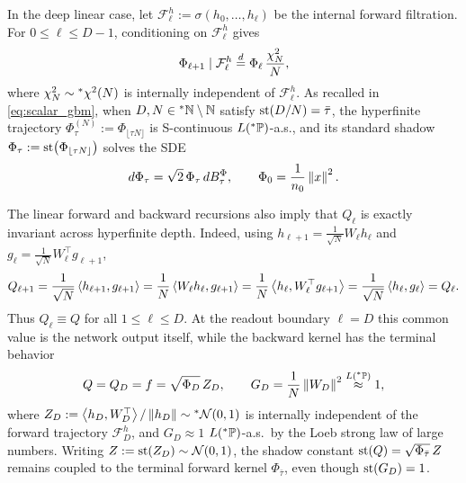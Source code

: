 \begin{remark}
\label{rem:forward-gbm-recall}
In the deep linear case, let $\mathcal{F}_\ell^h := \sigma(h_0, \dots, h_\ell)$ be the internal forward filtration. For $0 \le \ell \le D - 1$, conditioning on $\mathcal{F}_\ell^h$ gives
\begin{equation}
\label{eq:ch6-forward-chisq}
\Phi_{\ell+1} \mid \mathcal{F}_\ell^h \stackrel{d}{=} \Phi_\ell\,\frac{\chi_N^2}{N},
\end{equation}
where $\chi_N^2 \sim {}^*\chi^2(N)$ is internally independent of $\mathcal{F}_\ell^h$. As recalled in \eqref{eq:scalar_gbm},
when $D, N \in {}^*\mathbb{N} \setminus \mathbb{N}$ satisfy $\operatorname{st}(D/N) = \bar{\tau}$, the hyperfinite trajectory $\Phi_\tau^{(N)} := \Phi_{\lfloor \tau N \rfloor}$ is S-continuous $L({}^*\mathbb{P})$-a.s., and its standard shadow $\Phi_\tau := \operatorname{st}\bigl(\Phi_{\lfloor \tau N \rfloor}\bigr)$ solves the SDE
\begin{equation}
\label{eq:ch6-forward-gbm}
d\Phi_\tau = \sqrt{2}\,\Phi_\tau\,dB_\tau^\Phi, \qquad
\Phi_0 = \frac{1}{n_0}\left\lVert x \right\rVert^2.
\end{equation}
\end{remark}

The linear forward and backward recursions also imply that $Q_\ell$ is exactly invariant across hyperfinite depth. Indeed, using $h_{\ell+1} = \frac{1}{\sqrt{N}} W_\ell h_\ell$ and $g_\ell = \frac{1}{\sqrt{N}} W_\ell^\top g_{\ell+1}$,
\begin{equation}
\label{eq:ch6-Q-const}
Q_{\ell+1} = \frac{1}{\sqrt{N}}\left\langle h_{\ell+1}, g_{\ell+1} \right\rangle
= \frac{1}{N}\left\langle W_\ell h_\ell, g_{\ell+1} \right\rangle
= \frac{1}{N}\left\langle h_\ell, W_\ell^\top g_{\ell+1} \right\rangle
= \frac{1}{\sqrt{N}}\left\langle h_\ell, g_\ell \right\rangle
= Q_\ell.
\end{equation}
Thus $Q_\ell \equiv Q$ for all $1 \le \ell \le D$. At the readout boundary $\ell = D$ this common value is the network output itself, while the backward kernel has the terminal behavior
\begin{equation}
\label{eq:ch6-terminal-QG}
Q = Q_D = f = \sqrt{\Phi_D}\,Z_D, \qquad
G_D = \frac{1}{N}\left\lVert W_D \right\rVert^2 \stackrel{L({}^*\mathbb{P})}{\approx} 1,
\end{equation}
where $Z_D := \left\langle h_D, W_D^\top \right\rangle/\left\lVert h_D \right\rVert \sim {}^*\mathcal{N}(0, 1)$ is internally independent of the forward trajectory $\mathcal{F}_D^h$, and $G_D \approx 1$ $L({}^*\mathbb{P})$-a.s.\ by the Loeb strong law of large numbers. Writing $Z := \operatorname{st}(Z_D) \sim \mathcal{N}(0, 1)$, the shadow constant $\operatorname{st}(Q) = \sqrt{\Phi_{\bar{\tau}}}\,Z$ remains coupled to the terminal forward kernel $\Phi_{\bar{\tau}}$, even though $\operatorname{st}(G_D) = 1$.

